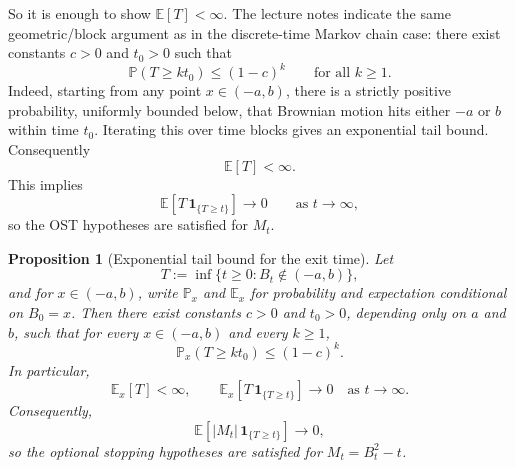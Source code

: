 \documentclass[11pt]{article}
\newtheorem{proposition}[theorem]{Proposition}
\theoremstyle{definition}
\begin{document}
So it is enough to show \(\mathbb E[T]<\infty\). The lecture notes indicate the same geometric/block argument as in the discrete-time Markov chain case: there exist constants \(c>0\) and \(t_0>0\) such that
\[
\mathbb P(T\ge k t_0)\le (1-c)^k
\qquad \text{for all } k\ge 1.
\]
Indeed, starting from any point \(x\in(-a,b)\), there is a strictly positive probability, uniformly bounded below, that Brownian motion hits either \(-a\) or \(b\) within time \(t_0\). Iterating this over time blocks gives an exponential tail bound. Consequently
\[
\mathbb E[T]<\infty.
\]
This implies
\[
\mathbb E\!\left[T\,\mathbf 1_{\{T\ge t\}}\right]\to 0
\qquad \text{as } t\to\infty,
\]
so the OST hypotheses are satisfied for \(M_t\).

\begin{proposition}[Exponential tail bound for the exit time]
Let
\[
T:=\inf\{t\ge 0:B_t\notin(-a,b)\},
\]
and for \(x\in(-a,b)\), write \(\mathbb P_x\) and \(\mathbb E_x\) for probability and expectation conditional on \(B_0=x\). Then there exist constants \(c>0\) and \(t_0>0\), depending only on \(a\) and \(b\), such that for every \(x\in(-a,b)\) and every \(k\ge 1\),
\[
\mathbb P_x(T\ge k t_0)\le (1-c)^k.
\]
In particular,
\[
\mathbb E_x[T]<\infty,
\qquad
\mathbb E_x\!\left[T\,\mathbf 1_{\{T\ge t\}}\right]\to 0
\quad \text{as } t\to\infty.
\]
Consequently,
\[
\mathbb E\!\left[|M_t|\,\mathbf 1_{\{T\ge t\}}\right]\to 0,
\]
so the optional stopping hypotheses are satisfied for \(M_t=B_t^2-t\).
\end{proposition}
\end{document}
